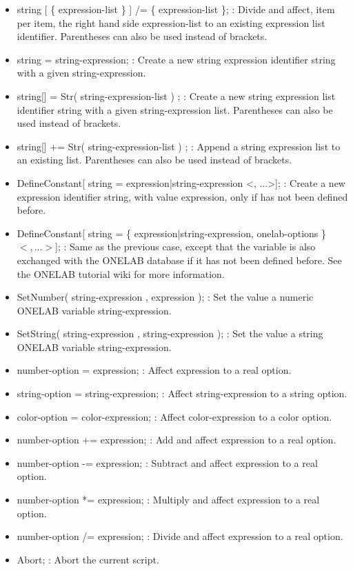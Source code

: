 \documentclass[dvipdfmx, 9pt, a4paper]{article}
\numberwithin{equation}{section}
\begin{document}
\begin{itemize}
\item string [ \{ expression-list \} ] /= \{ expression-list \}; : Divide and affect, item per item, the right hand side expression-list to an existing expression list identifier. Parentheses can also be used instead of brackets.
\item string = string-expression; : Create a new string expression identifier string with a given string-expression.
\item string[] = Str( string-expression-list ) ; : Create a new string expression list identifier string with a given string-expression list. Parentheses can also be used instead of brackets.
\item string[] += Str( string-expression-list ) ; : Append a string expression list to an existing list. Parentheses can also be used
instead of brackets.
\item DefineConstant[ string = expression|string-expression <, ...>]; : Create a new expression identifier string, with value expression, only if has not been defined before.
\item DefineConstant[ string = \{ expression|string-expression, onelab-options \} $<, ...>$]; : Same as the previous case, except that the variable is also exchanged with the ONELAB database if it has not been defined before. See the ONELAB tutorial wiki for more information.
\item SetNumber( string-expression , expression ); : Set the value a numeric ONELAB variable string-expression.
\item SetString( string-expression , string-expression ); : Set the value a string ONELAB variable string-expression.
\item number-option = expression; : Affect expression to a real option.
\item string-option = string-expression; : Affect string-expression to a string option.
\item color-option = color-expression; : Affect color-expression to a color option.
\item number-option += expression; : Add and affect expression to a real option.
\item number-option -= expression; : Subtract and affect expression to a real option.
\item number-option *= expression; : Multiply and affect expression to a real option.
\item number-option /= expression; : Divide and affect expression to a real option.
\item Abort; : Abort the current script.

\end{itemize}
\end{document}
